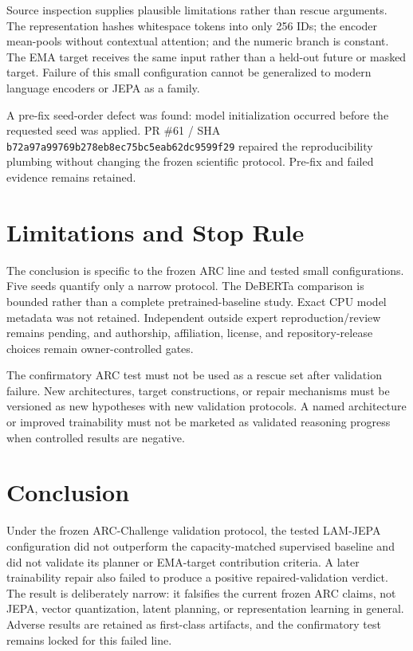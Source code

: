 \documentclass[conference]{IEEEtran}
\begin{document}
Source inspection supplies plausible limitations rather than rescue arguments. The representation hashes whitespace tokens into only 256 IDs; the encoder mean-pools without contextual attention; and the numeric branch is constant. The EMA target receives the same input rather than a held-out future or masked target. Failure of this small configuration cannot be generalized to modern language encoders or JEPA as a family.

A pre-fix seed-order defect was found: model initialization occurred before the requested seed was applied. PR \#61 / SHA \texttt{b72a97a99769b278eb8ec75bc5eab62dc9599f29} repaired the reproducibility plumbing without changing the frozen scientific protocol. Pre-fix and failed evidence remains retained.

\section{Limitations and Stop Rule}
The conclusion is specific to the frozen ARC line and tested small configurations. Five seeds quantify only a narrow protocol. The DeBERTa comparison is bounded rather than a complete pretrained-baseline study. Exact CPU model metadata was not retained. Independent outside expert reproduction/review remains pending, and authorship, affiliation, license, and repository-release choices remain owner-controlled gates.

The confirmatory ARC test must not be used as a rescue set after validation failure. New architectures, target constructions, or repair mechanisms must be versioned as new hypotheses with new validation protocols. A named architecture or improved trainability must not be marketed as validated reasoning progress when controlled results are negative.

\section{Conclusion}
Under the frozen ARC-Challenge validation protocol, the tested LAM-JEPA configuration did not outperform the capacity-matched supervised baseline and did not validate its planner or EMA-target contribution criteria. A later trainability repair also failed to produce a positive repaired-validation verdict. The result is deliberately narrow: it falsifies the current frozen ARC claims, not JEPA, vector quantization, latent planning, or representation learning in general. Adverse results are retained as first-class artifacts, and the confirmatory test remains locked for this failed line.
\end{document}
